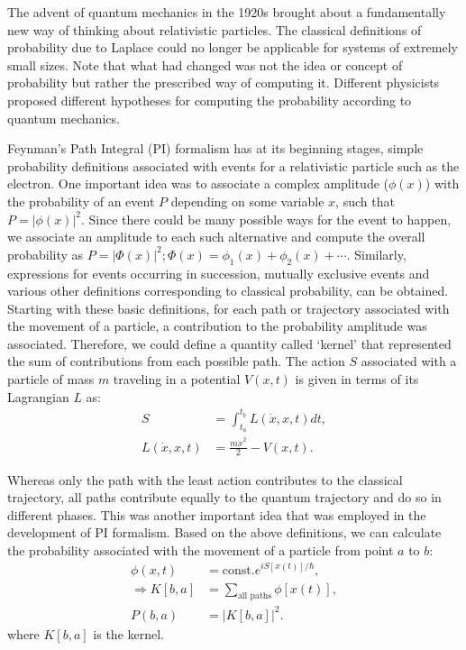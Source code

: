         The advent of quantum mechanics in the 1920s brought about a fundamentally new way of thinking about relativistic particles. The classical definitions of probability due to Laplace could no longer be applicable for systems of extremely small sizes. Note that what had changed was not the idea or concept of probability but rather the prescribed way of computing it. Different physicists proposed different hypotheses for computing the probability according to quantum mechanics.

        Feynman's Path Integral (PI) formalism has at its beginning stages, simple probability definitions associated with events for a relativistic particle such as the electron. One important idea was to associate a complex amplitude ($\phi(x)$) with the probability of an event $P$ depending on some variable $x$, such that $P = |\phi(x)|^2$. Since there could be many possible ways for the event to happen, we associate an amplitude to each such alternative and compute the overall probability as $P = |\Phi(x)|^2; \Phi(x) = \phi_1(x) + \phi_2(x) + \cdots$. Similarly, expressions for events occurring in succession, mutually exclusive events and various other definitions corresponding to classical probability, can be obtained. Starting with these basic definitions, for each path or trajectory associated with the movement of a particle, a contribution to the probability amplitude was associated. Therefore, we could define a quantity called `kernel' that represented the sum of contributions from each possible path. The action $S$ associated with a particle of mass $m$ traveling in a potential $V(x,t)$ is given in terms of its Lagrangian $L$ as:
        \begin{equation}
        \label{eq:action}
            \begin{aligned}
                S &= \displaystyle \int_{t_a}^{t_b} L(\dot{x},x,t) dt,\\
                L(\dot{x},x,t) &= \frac{m{\dot{x}}^2}{2} - V(x,t).
            \end{aligned}
        \end{equation}

        Whereas only the path with the least action contributes to the classical trajectory, all paths contribute equally to the quantum trajectory and do so in different phases. This was another important idea that was employed in the development of PI formalism. Based on the above definitions, we can calculate the probability associated with the movement of a particle from point $a$ to $b$:
        \begin{equation}
        \label{eq:quantum probability}
            \begin{aligned}
                \phi(x,t) &= \text{const.} e^{iS[x(t)]/\hbar},\\
                \Rightarrow K[b,a] &= \displaystyle\sum\limits_{\text{all paths}} \phi[x(t)],\\
                P(b,a) &= {|K[b,a]|}^2.
            \end{aligned}
        \end{equation}
        where $K[b,a]$ is the kernel.

